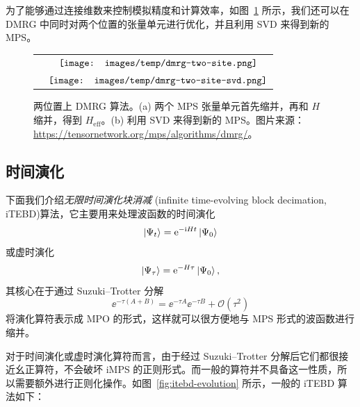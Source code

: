 为了能够通过连接维数来控制模拟精度和计算效率，如图~\ref{fig:dmrg-two-site} 所示，我们还可以在 DMRG 中同时对两个位置的张量单元进行优化，并且利用 SVD 来得到新的 MPS。

\begin{figure}[htb]
  \centering
  \begin{tabular}{cc}
    \parbox{2em}{\subcaption{}} &
      $\vcenter{\hbox{\texttt{[image: images/temp/dmrg-two-site.png]}}}$ \\
    \parbox{2em}{\subcaption{}} &
      $\vcenter{\hbox{\texttt{[image: images/temp/dmrg-two-site-svd.png]}}}$
  \end{tabular}
  \caption[两位置上 DMRG 算法]{两位置上 DMRG 算法。(a) 两个 MPS 张量单元首先缩并，再和 $H$ 缩并，得到 $H_{\text{eff}}$。(b) 利用 SVD 来得到新的 MPS。图片来源：\url{https://tensornetwork.org/mps/algorithms/dmrg/}。}
  \label{fig:dmrg-two-site}
\end{figure}

\subsection{时间演化}
\label{subsec:mps-time-evolution}

下面我们介绍\emph{无限时间演化块消减} (infinite time-evolving block decimation, iTEBD)\cite{vidal2007classical,orus2008infinite}算法，它主要用来处理波函数的时间演化
\begin{equation}
  \ket{\Psi_t} = \ee^{-\ii Ht} \ket{\Psi_0}
\end{equation}
或虚时演化
\begin{equation}
  \ket{\Psi_\tau} = \ee^{-H\tau} \ket{\Psi_0},
\end{equation}
其核心在于通过 Suzuki--Trotter 分解\cite{sornborger1999higher}
\begin{equation}
  \ee^{-\tau(A+B)} = \ee^{-\tau A} \ee^{-\tau B} + \mathcal{O}(\tau^2)
\end{equation}
将演化算符表示成 MPO 的形式，这样就可以很方便地与 MPS 形式的波函数进行缩并。

对于时间演化或虚时演化算符而言，由于经过 Suzuki--Trotter 分解后它们都很接近幺正算符，不会破坏 iMPS 的正则形式。而一般的算符并不具备这一性质，所以需要额外进行正则化操作。如图~\ref{fig:itebd-evolution} 所示，一般的 iTEBD 算法如下：


